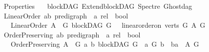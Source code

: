 %
\begin{isabellebody}%
%
%
\isadelimtheory
%
\endisadelimtheory
%
\isatagtheory
{}\isamarkupfalse%
\ Properties\isanewline
\ \ \ blockDAG\ Extend{\isacharunderscore}{\kern0pt}blockDAG\ Spectre\ Ghostdag\isanewline
{}%
\endisatagtheory
{\isafoldtheory}%
%
\isadelimtheory
\isanewline
%
\endisadelimtheory
\isanewline
{}\isamarkupfalse%
\ Linear{\isacharunderscore}{\kern0pt}Order{\isacharcolon}{\kern0pt}{\isacharcolon}{\kern0pt}\ {\isachardoublequoteopen}{\isacharparenleft}{\kern0pt}{\isacharparenleft}{\kern0pt}{\isacharprime}{\kern0pt}a{\isacharcomma}{\kern0pt}{\isacharprime}{\kern0pt}b{\isacharparenright}{\kern0pt}\ pre{\isacharunderscore}{\kern0pt}digraph\ {\isasymRightarrow}\ {\isacharprime}{\kern0pt}a\ rel{\isacharparenright}{\kern0pt}\ {\isasymRightarrow}\ bool{\isachardoublequoteclose}\isanewline
\ \ \ {\isachardoublequoteopen}Linear{\isacharunderscore}{\kern0pt}Order\ A\ {\isasymequiv}\ {\isacharparenleft}{\kern0pt}{\isasymforall}G{\isachardot}{\kern0pt}\ blockDAG\ G\ \ {\isasymlongrightarrow}\ linear{\isacharunderscore}{\kern0pt}order{\isacharunderscore}{\kern0pt}on\ {\isacharparenleft}{\kern0pt}verts\ G{\isacharparenright}{\kern0pt}\ {\isacharparenleft}{\kern0pt}A\ G{\isacharparenright}{\kern0pt}{\isacharparenright}{\kern0pt}{\isachardoublequoteclose}\isanewline
\isanewline
\isanewline
{}\isamarkupfalse%
\ Order{\isacharunderscore}{\kern0pt}Preserving{\isacharcolon}{\kern0pt}{\isacharcolon}{\kern0pt}\ {\isachardoublequoteopen}{\isacharparenleft}{\kern0pt}{\isacharparenleft}{\kern0pt}{\isacharprime}{\kern0pt}a{\isacharcomma}{\kern0pt}{\isacharprime}{\kern0pt}b{\isacharparenright}{\kern0pt}\ pre{\isacharunderscore}{\kern0pt}digraph\ {\isasymRightarrow}\ {\isacharprime}{\kern0pt}a\ rel{\isacharparenright}{\kern0pt}\ {\isasymRightarrow}\ bool\ {\isachardoublequoteclose}\isanewline
\ \ \ {\isachardoublequoteopen}Order{\isacharunderscore}{\kern0pt}Preserving\ A\ {\isasymequiv}\ {\isacharparenleft}{\kern0pt}{\isasymforall}G\ a\ b{\isachardot}{\kern0pt}\ blockDAG\ G\ {\isasymlongrightarrow}\ a\ {\isasymrightarrow}\isactrlsup {\isacharplus}{\kern0pt}\isactrlbsub G\isactrlesub \ b\ {\isasymlongrightarrow}\ {\isacharparenleft}{\kern0pt}b{\isacharcomma}{\kern0pt}a{\isacharparenright}{\kern0pt}\ {\isasymin}\ {\isacharparenleft}{\kern0pt}A\ G{\isacharparenright}{\kern0pt}{\isacharparenright}{\kern0pt}{\isachardoublequoteclose}\isanewline
\isanewline
\isanewline
{}\isamarkupfalse%

\end{isabellebody}
